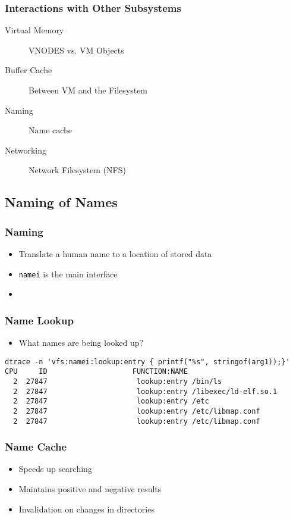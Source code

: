 \documentclass[pdftex]{beamer} %
\begin{document}
\begin{frame}
  \frametitle{Interactions with Other Subsystems}
  \begin{description}
  \item[Virtual Memory] VNODES vs. VM Objects
  \item[Buffer Cache] Between VM and the Filesystem
  \item[Naming] Name cache
  \item[Networking] Network Filesystem (NFS)
  \end{description}
\end{frame}

\subsection{Naming of Names}
\label{sec:naming}

\begin{frame}[fragile]
  \frametitle{Naming}
  \begin{itemize}
  \item Translate a human name to a location of stored data
  \item \verb+namei+ is the main interface
  \item 
  \end{itemize}
\end{frame}

\begin{frame}[fragile]
  \frametitle{Name Lookup}
  \begin{itemize}
  \item What names are being looked up?
  \end{itemize}
\begin{lstlisting}
dtrace -n 'vfs:namei:lookup:entry { printf("%s", stringof(arg1));}'
CPU     ID                    FUNCTION:NAME
  2  27847                     lookup:entry /bin/ls
  2  27847                     lookup:entry /libexec/ld-elf.so.1
  2  27847                     lookup:entry /etc
  2  27847                     lookup:entry /etc/libmap.conf
  2  27847                     lookup:entry /etc/libmap.conf
\end{lstlisting}
\end{frame}

\begin{frame}
  \frametitle{Name Cache}
  \begin{itemize}
  \item Speeds up searching
  \item Maintains positive and negative results
  \item Invalidation on changes in directories
  \end{itemize}
\end{frame}
\end{document}
